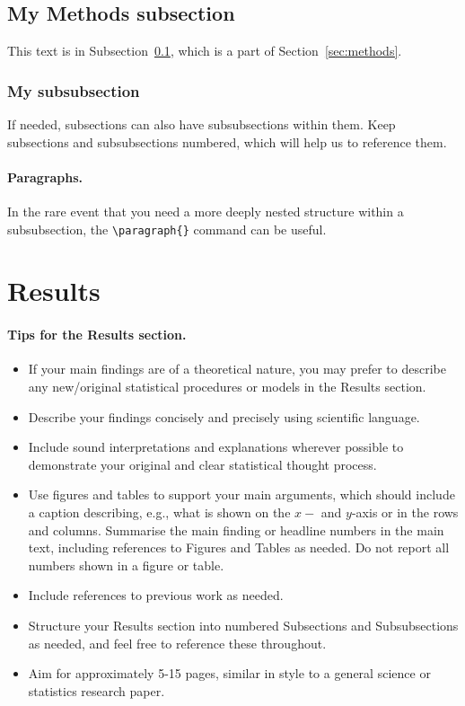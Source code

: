\documentclass{statsmsc}
\begin{document}
\subsection{My Methods subsection}\label{subsec:my_subsec}

This text is in Subsection~\ref{subsec:my_subsec}, which is a part of Section~\ref{sec:methods}.

\subsubsection{My subsubsection}
If needed, subsections can also have subsubsections within them. Keep subsections and subsubsections numbered, which will help us to reference them.


\paragraph{Paragraphs.} In the rare event that you need a more deeply nested structure within a subsubsection, the \texttt{\textbackslash paragraph\{\}} command can be useful. 

\section{Results}

\paragraph{Tips for the Results section.} 

\begin{itemize}
    \item If your main findings are of a theoretical nature, you may prefer to describe any new/original statistical procedures or models in the Results section.
    \item Describe your findings concisely and precisely using scientific language. 
    \item Include sound interpretations and explanations wherever possible to demonstrate your original and clear statistical thought process. 
    \item Use figures and tables to support your main arguments, which should include a caption describing, e.g., what is shown on the $x-$ and $y$-axis or in the rows and columns. Summarise the main finding or headline numbers in the main text, including references to Figures and Tables as needed. Do not report all numbers shown in a figure or table.
    \item Include references to previous work as needed. 
    \item Structure your Results section into numbered Subsections and Subsubsections as needed, and feel free to reference these throughout.
    \item Aim for approximately 5-15 pages, similar in style to a general science or statistics research paper.
\end{itemize}
\end{document}
